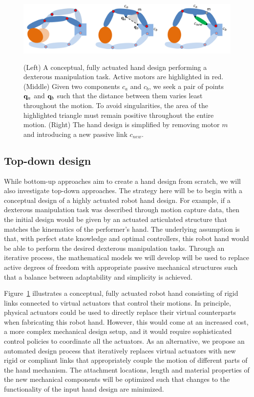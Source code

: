 \begin{figure}
\begin{center}
{\includegraphics[width=6in]{./figs/handDesign.png}}
\end{center}
\vspace*{-0.2in}
\caption[]{\small (Left) A conceptual, fully actuated hand design performing a dexterous manipulation task. Active motors are highlighted in red. (Middle) Given two components $c_a$ and $c_b$, we seek a pair of points $\mathbf{q}_a$ and $\mathbf{q}_b$ such that the distance between them varies least throughout the motion. To avoid singularities, the area of the highlighted triangle must remain positive throughout the entire motion. (Right) The hand design is simplified by removing motor $m$ and introducing a new passive link $c_{new}$.}
\label{handMechanismDesign}
\end{figure}

\subsection{Top-down design}

While bottom-up approaches aim to create a hand design from scratch, we will also investigate top-down approaches. The strategy here will be to begin with a conceptual design of a highly actuated robot hand design. For example, if a dexterous manipulation task was described through motion capture data, then the initial design would be given by an actuated articulated structure that matches the kinematics of the performer's hand. The underlying assumption is that, with perfect state knowledge and optimal controllers, this robot hand would be able to perform the desired dexterous manipulation tasks. Through an iterative process, the mathematical models we will develop will be used to replace active degrees of freedom with appropriate passive mechanical structures such that a balance between adaptability and simplicity is achieved. 

Figure~\ref{handMechanismDesign} illustrates a conceptual, fully actuated robot hand consisting of rigid links connected to virtual actuators that control their motions. In principle, physical actuators could be used to directly replace their virtual counterparts when fabricating this robot hand. However, this would come at an increased cost, a more complex mechanical design setup, and it would require sophisticated control policies to coordinate all the actuators. As an alternative, we propose an automated design process that iteratively replaces virtual actuators with new rigid or compliant links that appropriately couple the motion of different parts of the hand mechanism. The attachment locations, length and material properties of the new mechanical components will be optimized such that changes to the functionality of the input hand design are minimized. 

